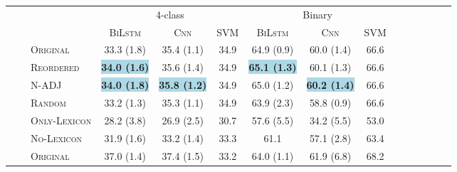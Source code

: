 \documentclass[a4paper,11pt,twocolumn,twoside]{article}
\newcommand{\original}{\textsc{Original}\xspace}
\newcommand{\mtreordered}{\textsc{Reordered}\xspace}
\newcommand{\random}{\textsc{Random}\xspace}
\newcommand{\onlylex}{\textsc{Only-Lexicon}\xspace}
\newcommand{\nolex}{\textsc{No-Lexicon}\xspace}
\newcommand{\bilstm}{\textsc{BiLstm}\xspace}
\newcommand{\cnn}{\textsc{Cnn}\xspace}
\newcommand{\rt}[1]{\rotatebox{90}{#1}}
\begin{document}
\begin{table*}[th!]
\newcommand{\sep}{\cmidrule(r){4-6}\cmidrule(r){7-9}}
\newcommand{\sepp}{\cmidrule(r){4-4}\cmidrule(r){5-5}\cmidrule(r){6-6}\cmidrule(r){7-7}\cmidrule(r){8-8}\cmidrule(r){9-9}}


\newcommand{\bestproj}[1]{{\setlength{\fboxsep}{0pt}\colorbox{lightblue}{\textbf{#1}}}}
\newcommand{\bestmono}[1]{{\setlength{\fboxsep}{0pt}\colorbox{lightgreen}{\textbf{#1}}}}
\newcommand{\bestmt}[1]{{\setlength{\fboxsep}{0pt}\colorbox{pink}{\textbf{#1}}}}

\setlength\tabcolsep{4pt}
\renewcommand*{\arraystretch}{0.5}
\centering
\begin{tabular}{lllcccccccccccc}
\toprule
&& & \multicolumn{3}{c}{4-class} & \multicolumn{3}{c}{Binary} \\
\sep
\multirow{20}{*}{\rt{BWE}} 
	    &&& \bilstm & \cnn & SVM & \bilstm & \cnn & SVM \\
	    \cmidrule(r){4-4}\cmidrule(r){5-5}\cmidrule(r){6-6}\cmidrule(r){7-7}\cmidrule(r){8-8}\cmidrule(r){9-9}
	& \multirow{6}{*}{\rt{EN-ES}}
		& \original 	 & 33.3 \scriptsize{(1.8)}   & 35.4 \scriptsize{(1.1)} & 34.9 & 64.9 \scriptsize{(0.9)}  & 60.0 \scriptsize{(1.4)} & 66.6\\ 
		&& \mtreordered  & \bestproj{34.0 \scriptsize{(1.6)}} & 35.6 \scriptsize{(1.4)} & 34.9 & \bestproj{65.1 \scriptsize{(1.3)}}  & 60.1 \scriptsize{(1.3)} & 66.6\\ 
		&& N-ADJ         & \bestproj{34.0 \scriptsize{(1.8)}} & \bestproj{35.8 \scriptsize{(1.2)}} & 34.9 & 65.0 \scriptsize{(1.2)}  & \bestproj{60.2 \scriptsize{(1.4)}} & 66.6\\ 
		&& \random       & 33.2 \scriptsize{(1.3)} & 35.3 \scriptsize{(1.1)} & 34.9 & 63.9 \scriptsize{(2.3)}  & 58.8 \scriptsize{(0.9)} & 66.6\\ 
		&& \onlylex      & 28.2 \scriptsize{(3.8)} & 26.9 \scriptsize{(2.5)} & 30.7 & 57.6 \scriptsize{(5.5)}  & 34.2 \scriptsize{(5.5)} & 53.0\\ 
		&& \nolex        & 31.9 \scriptsize{(1.6)} & 33.2 \scriptsize{(1.4)} & 33.3 & 61.1   & 57.1 \scriptsize{(2.8)} & 63.4\\ 
	\sepp
	& \multirow{6}{*}{\rt{EN-CA}}
  		& \original      &  37.0 \scriptsize{(1.4)} & 37.4 \scriptsize{(1.5)} & 33.2 & 64.0 \scriptsize{(1.1)} & 61.9 \scriptsize{(6.8)} & 68.2\\ 

\end{tabular}
\end{table*}
\end{document}
